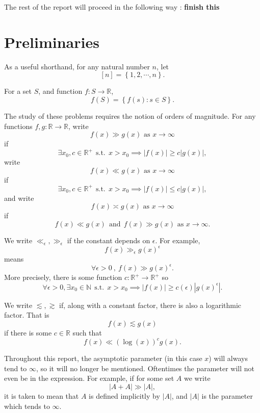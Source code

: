 \documentclass[12pt,reqno]{amsart}
\begin{document}
The rest of the report will proceed in the following way : \textbf{finish this}

\section{Preliminaries}

As a useful shorthand, for any natural number \(n\), let
\[
    [n] = \left\{ 1, 2 , \cdots , n \right\} 
.\]

For a set \(S\), and function \(f : S \to \mathbb{R} \),
\[
    f(S) = \left\{ f(s) : s \in S\right\} 
.\]

The study of these problems requires the notion of orders of magnitude.
For any functions \(f,g: \mathbb{R}   \to \mathbb{R} \), write
\[
    f(x) \gg g(x) \text{ as } x \to \infty 
\]
if
\[
    \exists x_0,c \in \mathbb{R} ^{+}~~\text{s.t.}~~ x > x_0 \implies \left\lvert f(x) \right\rvert \geq c \left\lvert g(x) \right\rvert  
,\]
write
\[
    f(x) \ll g(x) \text{ as } x \to \infty 
\]
if
\[
     \exists x_0,c \in \mathbb{R} ^{+}~~\text{s.t.}~~ x > x_0 \implies \left\lvert f(x) \right\rvert \leq c \left\lvert g(x) \right\rvert 
,\]
and write
\[
    f(x) \asymp g(x) \text{ as } x \to \infty 
\]
if
\[
    f(x) \ll g(x)  ~ ~ \text{and} ~ ~ f(x) \gg g(x) \text{ as } x \to \infty 
.\]

We write \(\ll _{\epsilon},\gg _{\epsilon} \) if the constant depends on \(\epsilon\). For example,
\[
    f(x) \gg _{\epsilon} g(x) ^{ \epsilon}
\]
means
\[
   \forall \epsilon> 0~,~ f(x) \gg g(x) ^{\epsilon}
.\]
More precisely, there is some function \(c : \mathbb{R} ^{+ }\to \mathbb{R} ^{+}\) so
\[
    \forall \epsilon > 0, \exists x_0\in \mathbb{N} ~~\text{s.t.}~~ x > x_0 \implies \left\lvert f(x) \right\rvert \geq c (\epsilon)\left\lvert g(x) ^{\epsilon} \right\rvert
.\]

We write \(\lesssim , \gtrsim \) if, along with a constant factor, there is also a logarithmic factor.
That is
\[
    f(x) \lesssim  g(x)
\]
if there is some \(c \in \mathbb{R} \) such that
\[
    f(x) \ll \left( \log \left( x \right)  \right) ^{c} g(x)
.\]

Throughout this report, the asymptotic parameter (in this case \(x\)) will always tend to \(\infty \),
so it will no longer be mentioned.
Oftentimes the parameter will not even be in the expression. For example,
if for some set \(A\) we write
\[
    \left\lvert A + A \right\rvert \gg \left\lvert A \right\rvert 
,\]
it is taken to mean that \(A\) is defined implicitly by \(\left\lvert A \right\rvert \), and
\(\left\lvert A \right\rvert \) is the parameter which tends to \(\infty \).
\end{document}
